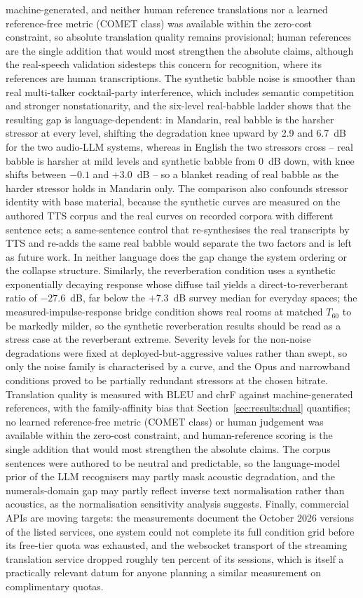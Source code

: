 machine-generated, and neither human reference translations nor a learned
reference-free metric (COMET class) was available within the zero-cost
constraint, so absolute translation quality remains provisional; human
references are the single addition that would most strengthen the absolute
claims, although the real-speech validation sidesteps this concern for
recognition, where its references are human transcriptions. The synthetic
babble noise is smoother than real multi-talker cocktail-party interference,
which includes semantic competition and stronger nonstationarity, and the
six-level real-babble ladder shows that the resulting gap is
language-dependent: in Mandarin, real babble is the harsher stressor at
every level, shifting the degradation knee upward by 2.9 and 6.7~dB for the
two audio-LLM systems, whereas in English the two stressors cross -- real
babble is harsher at mild levels and synthetic babble from 0~dB down, with
knee shifts between $-0.1$ and $+3.0$~dB -- so a blanket reading of real
babble as the harder stressor holds in Mandarin only. The comparison also
confounds stressor identity with base material, because the synthetic
curves are measured on the authored TTS corpus and the real curves on
recorded corpora with different sentence sets; a same-sentence control that
re-synthesises the real transcripts by TTS and re-adds the same real babble
would separate the two factors and is left as future work. In neither
language does the gap change the system ordering or the collapse structure.
Similarly, the reverberation condition uses a synthetic
exponentially decaying response whose diffuse tail yields a
direct-to-reverberant ratio of $-27.6$~dB, far below the $+7.3$~dB survey
median for everyday spaces; the measured-impulse-response bridge condition
shows real rooms at matched $T_{60}$ to be markedly milder, so the
synthetic reverberation results should be read as a stress case at the
reverberant extreme. Severity levels
for the non-noise degradations were fixed at deployed-but-aggressive values
rather than swept, so only the noise family is characterised by a curve,
and the Opus and narrowband conditions proved to be partially redundant
stressors at the chosen bitrate. Translation quality is measured with BLEU
and chrF against machine-generated references, with the family-affinity
bias that Section~\ref{sec:results:dual} quantifies; no learned
reference-free metric (COMET class) or human judgement was available within
the zero-cost constraint, and human-reference scoring is the single
addition that would most strengthen the absolute claims. The corpus
sentences were authored to be neutral and predictable, so the language-model
prior of the LLM recognisers may partly mask acoustic degradation, and the
numerals-domain gap may partly reflect inverse text normalisation rather
than acoustics, as the normalisation sensitivity analysis suggests.
Finally, commercial APIs are moving targets: the
measurements document the October 2026 versions of the listed services, one
system could not complete its full condition grid before its
free-tier quota was exhausted, and the websocket transport of the streaming
translation service dropped roughly ten percent of its sessions, which is
itself a practically relevant datum
for anyone planning a similar measurement on complimentary quotas.

